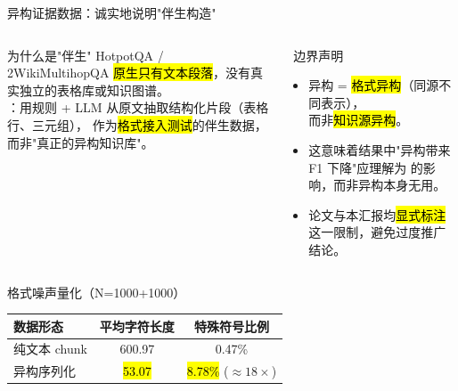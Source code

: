 \begin{frame}{异构证据数据：诚实地说明"伴生构造"}
  \begin{columns}[T,onlytextwidth]
    \begin{block}{为什么是"伴生"}
      \footnotesize
      HotpotQA / 2WikiMultihopQA \hl{原生只有文本段落}，没有真实独立的表格库或知识图谱。\\[0.4em]
      ：用规则 + LLM 从原文抽取结构化片段（表格行、三元组），
      作为\hl{格式接入测试}的伴生数据，而非"真正的异构知识库"。
    \end{block}

    \begin{alertblock}{\faExclamationTriangle\ 边界声明}
      \footnotesize
      \begin{itemize}
        \item 异构 = \hl{格式异构}（同源不同表示），\\
              而非\hl{知识源异构}。
        \item 这意味着结果中"异构带来 F1 下降"应理解为
              的影响，而非异构本身无用。
        \item 论文与本汇报均\hl{显式标注}这一限制，避免过度推广结论。
      \end{itemize}
    \end{alertblock}
  \end{columns}

  \vspace{0.4em}
  \begin{exampleblock}{格式噪声量化（N=1000+1000）}
    \footnotesize
    \centering
    \begin{tabular}{@{}lcc@{}}
      \toprule
      数据形态 & 平均字符长度 & 特殊符号比例 \\ \midrule
      纯文本 chunk      & 600.97 & 0.47\% \\
      异构序列化        & \hl{53.07}  & \hl{8.78\%} \quad ($\approx 18\times$) \\
      \bottomrule
    \end{tabular}
  \end{exampleblock}
\end{frame}

